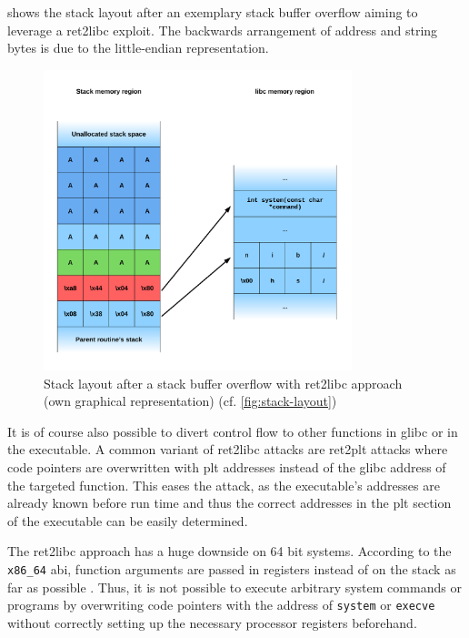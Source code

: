  shows the stack layout after an exemplary stack buffer overflow aiming to leverage a \gls{ret2libc} exploit.
The backwards arrangement of address and string bytes is due to the little-endian representation.

\begin{figure}[htb]
	\centering
	\includegraphics[width=0.8\textwidth]{figures/ret2libc}
	\caption{Stack layout after a stack buffer overflow with \acs{ret2libc} approach (own graphical representation) (cf. \cref{fig:stack-layout})}
	\label{fig:ret2libc}
\end{figure}

It is of course also possible to divert control flow to other functions in \gls{glibc} or in the executable.
A common variant of \gls{ret2libc} attacks are \gls{ret2plt} attacks where code pointers are overwritten with \gls{plt} addresses instead of the \gls{glibc} address of the targeted function.
This eases the attack, as the executable's addresses are already known before run time and thus the correct addresses in the \gls{plt} section of the executable can be easily determined.

The \gls{ret2libc} approach has a huge downside on 64 bit systems.
According to the \texttt{x86\_64} \gls{abi}, function arguments are passed in registers instead of on the stack as far as possible \cites[19\psqq]{Lu2018}[17\psqq]{Fog2019}.
Thus, it is not possible to execute arbitrary system commands or programs by overwriting code pointers with the address of \texttt{system} or \texttt{execve} without correctly setting up the necessary processor registers beforehand.


